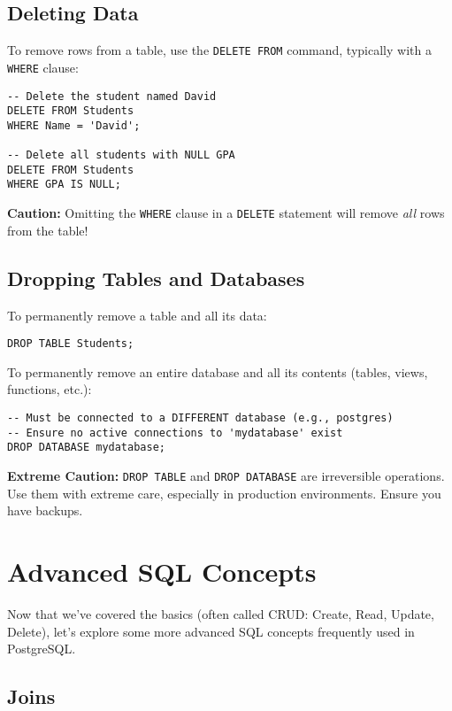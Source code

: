 \documentclass[12pt]{book}
\begin{document}
\subsection{Deleting Data}

To remove rows from a table, use the \texttt{DELETE FROM} command, typically with a \texttt{WHERE} clause:

\begin{lstlisting}[caption={Deleting data from Students}, label=lst:delete_students]
-- Delete the student named David
DELETE FROM Students
WHERE Name = 'David';

-- Delete all students with NULL GPA
DELETE FROM Students
WHERE GPA IS NULL;
\end{lstlisting}
\textbf{Caution:} Omitting the \texttt{WHERE} clause in a \texttt{DELETE} statement will remove \emph{all} rows from the table!

\subsection{Dropping Tables and Databases}

To permanently remove a table and all its data:

\begin{lstlisting}[caption={Dropping a Table}, label=lst:drop_table]
DROP TABLE Students;
\end{lstlisting}

To permanently remove an entire database and all its contents (tables, views, functions, etc.):

\begin{lstlisting}[caption={Dropping a Database}, label=lst:drop_db]
-- Must be connected to a DIFFERENT database (e.g., postgres)
-- Ensure no active connections to 'mydatabase' exist
DROP DATABASE mydatabase;
\end{lstlisting}
\textbf{Extreme Caution:} \texttt{DROP TABLE} and \texttt{DROP DATABASE} are irreversible operations. Use them with extreme care, especially in production environments. Ensure you have backups.

\section{Advanced SQL Concepts}

Now that we've covered the basics (often called CRUD: Create, Read, Update, Delete), let's explore some more advanced SQL concepts frequently used in PostgreSQL.

\subsection{Joins}
\end{document}
